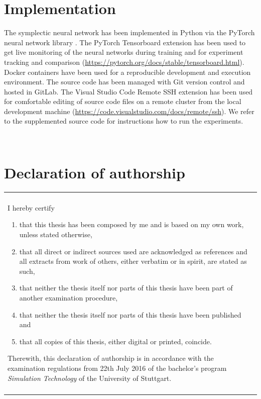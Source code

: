 \documentclass[twoside,a4paper]{article}
\begin{document}
%
%
\clearpage\newpage\null %
\newpage
\begin{appendices}
\section{Implementation}

The symplectic neural network has been implemented in Python via the PyTorch neural network
library \cite{PyTorch2019}. The PyTorch Tensorboard extension has been used to get 
live monitoring of the neural networks during training and for experiment tracking 
and comparison (\url{https://pytorch.org/docs/stable/tensorboard.html}). 
Docker containers have been used for a reproducible
development and execution environment. The source code has been managed with Git
version control and hosted in GitLab. The Visual Studio Code Remote SSH extension
has been used for comfortable editing of source code files on
a remote cluster from the local development machine
(\url{https://code.visualstudio.com/docs/remote/ssh}). We refer to the supplemented
source code for instructions how to run the experiments.

\newpage~\newpage
\section{Declaration of authorship}

\vspace{3cm}

\begin{table}[h!]
\centering
\begin{tabular}{|p{13cm}|}
\hline\\
	I hereby certify
	\begin{enumerate}
		\item that this thesis has been composed by me and is based on my own work, unless stated otherwise,
		\item that all direct or indirect sources used are acknowledged as references and all extracts from work of others, either verbatim or in spirit, are stated as such,
		\item that neither the thesis itself nor parts of this thesis have been part of another examination procedure,
		\item that neither the thesis itself nor parts of this thesis have been published and
		\item that all copies of this thesis, either digital or printed, coincide.
	\end{enumerate}
	Therewith, this declaration of authorship is in accordance with the examination regulations from 22th July 2016 of the bachelor's program \emph{Simulation Technology} of the University of Stuttgart.\\\\
\hline
\end{tabular}
\end{table}


\end{appendices}
\end{document}
